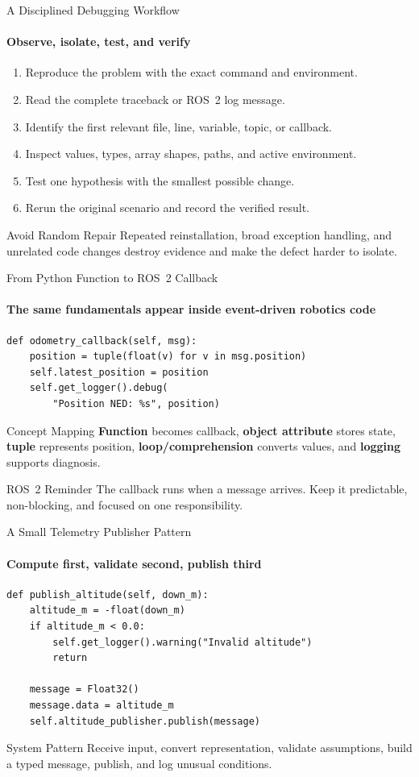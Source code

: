 \begin{frame}{A Disciplined Debugging Workflow}
\framesubtitle{Observe, isolate, test, and verify}
\begin{enumerate}
\item Reproduce the problem with the exact command and environment.
\item Read the complete traceback or ROS~2 log message.
\item Identify the first relevant file, line, variable, topic, or callback.
\item Inspect values, types, array shapes, paths, and active environment.
\item Test one hypothesis with the smallest possible change.
\item Rerun the original scenario and record the verified result.
\end{enumerate}
\begin{alertblock}{Avoid Random Repair}
Repeated reinstallation, broad exception handling, and unrelated code changes destroy evidence and make the defect harder to isolate.
\end{alertblock}
\end{frame}

\begin{frame}[fragile]{From Python Function to ROS~2 Callback}
\framesubtitle{The same fundamentals appear inside event-driven robotics code}
\begin{verbatim}
def odometry_callback(self, msg):
    position = tuple(float(v) for v in msg.position)
    self.latest_position = position
    self.get_logger().debug(
        "Position NED: %s", position)
\end{verbatim}
\begin{exampleblock}{Concept Mapping}
\textbf{Function} becomes callback, \textbf{object attribute} stores state, \textbf{tuple} represents position, \textbf{loop/comprehension} converts values, and \textbf{logging} supports diagnosis.
\end{exampleblock}
\begin{block}{ROS~2 Reminder}
The callback runs when a message arrives. Keep it predictable, non-blocking, and focused on one responsibility.
\end{block}
\end{frame}

\begin{frame}[fragile]{A Small Telemetry Publisher Pattern}
\framesubtitle{Compute first, validate second, publish third}
\begin{verbatim}
def publish_altitude(self, down_m):
    altitude_m = -float(down_m)
    if altitude_m < 0.0:
        self.get_logger().warning("Invalid altitude")
        return

    message = Float32()
    message.data = altitude_m
    self.altitude_publisher.publish(message)
\end{verbatim}
\begin{block}{System Pattern}
Receive input, convert representation, validate assumptions, build a typed message, publish, and log unusual conditions.
\end{block}
\end{frame}

